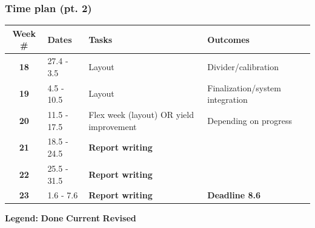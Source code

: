 \documentclass[t, screen, aspectratio=43]{beamer}
\begin{document}
\begin{frame}
	\frametitle{Time plan (pt. 2)}
	\begin{table}[htb!]
		\tiny
		\centering
		\vspace{-1em}
		\def\arraystretch{1.5}		
		\setlength\arrayrulewidth{0.75pt}
		\setlength{\tabcolsep}{1em} %
		\begin{tabular}{|c|l|l|l|}
			\hline 
			\rule[-1ex]{0pt}{2.5ex}\cellcolor{gray!40}\textbf{Week \#} & \cellcolor{gray!40}\textbf{Dates} &\cellcolor{gray!40}\textbf{Tasks} & \cellcolor{gray!40}\textbf{Outcomes}\\ 
			\hline 
			\rule[-1ex]{0pt}{2.5ex}\textbf{18}& 27.4 - 3.5 & Layout & Divider/calibration\\ 
			\hline 
			\rule[-1ex]{0pt}{2.5ex}\textbf{19}& 4.5 - 10.5 & Layout & Finalization/system integration\\ 
			\hline 
			\rule[-1ex]{0pt}{2.5ex}\textbf{20}& 11.5 - 17.5 & Flex week (layout) OR yield improvement & Depending on progress\\ 
			\hline 
			\rule[-1ex]{0pt}{2.5ex}\textbf{21}& 18.5 - 24.5& {\color{blue}\textbf{Report writing}} & \\ 
			\hline 
			\rule[-1ex]{0pt}{2.5ex}\textbf{22}& 25.5 - 31.5& {\color{blue}\textbf{Report writing}} & \\ 
			\hline 
			\rule[-1ex]{0pt}{2.5ex}\textbf{23}& 1.6 - 7.6& {\color{blue}\textbf{Report writing}} & {\color{red}\textbf{Deadline 8.6}}\\ 
			\hline 
		\end{tabular}
		\begin{flushleft}\textbf{Legend:} \colorbox{red!20}{\textbf{Done}} \colorbox{green!20}{\textbf{Current}}  \colorbox{blue!20}{\textbf{Revised}}
		\end{flushleft}
	\end{table}   
\end{frame}



\end{document}
